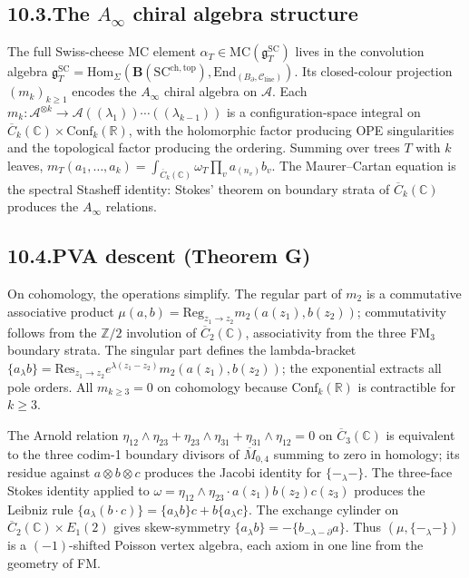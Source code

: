 \documentclass[11pt,reqno]{amsart}
\theoremstyle{definition}
\theoremstyle{remark}
\providecommand{\cA}{\mathcal{A}}
\providecommand{\cC}{\mathcal{C}}
\providecommand{\MC}{\mathrm{MC}}
\providecommand{\Hom}{\mathrm{Hom}}
\providecommand{\Res}{\mathrm{Res}}
\providecommand{\FM}{\overline{C}}
\providecommand{\fg}{\mathfrak{g}}
\providecommand{\bC}{\mathbb{C}}
\providecommand{\bZ}{\mathbb{Z}}
\providecommand{\bR}{\mathbb{R}}
\providecommand{\SCchtop}{\mathrm{SC}^{\mathrm{ch,top}}}
\providecommand{\End}{\mathrm{End}}
\providecommand{\Conf}{\mathrm{Conf}}
\providecommand{\SC}{\mathrm{SC}}
\providecommand{\Reg}{\mathrm{Reg}}
\numberwithin{equation}{section}
\begin{document}
\subsection*{10.3.\enspace The $A_\infty$ chiral algebra structure}

The full Swiss-cheese MC element $\alpha_T \in \MC(\fg^{\SC}_T)$
lives in the convolution algebra
$\fg^{\SC}_T = \Hom_\Sigma(\mathbf B(\SCchtop),
\End_{(B_\partial, \cC_{\mathrm{line}})})$. Its closed-colour
projection $(m_k)_{k \ge 1}$ encodes the $A_\infty$ chiral
algebra on $\cA$. Each $m_k\colon \cA^{\otimes k} \to
\cA(\!(\lambda_1)\!)\cdots(\!(\lambda_{k-1})\!)$ is a
configuration-space integral on
$\FM_k(\bC) \times \Conf_k(\bR)$, with the holomorphic factor
producing OPE singularities and the topological factor
producing the ordering. Summing over trees $T$ with $k$ leaves,
$m_T(a_1,\ldots,a_k) = \int_{\FM_k(\bC)}\omega_T \prod_{v}
a_{(n_v)} b_v$. The Maurer--Cartan equation is the spectral
Stasheff identity: Stokes' theorem on boundary strata of
$\FM_k(\bC)$ produces the $A_\infty$ relations.

\subsection*{10.4.\enspace PVA descent (Theorem G)}

On cohomology, the operations simplify. The regular part of
$m_2$ is a commutative associative product
$\mu(a,b) = \Reg_{z_1 \to z_2} m_2(a(z_1), b(z_2))$;
commutativity follows from the $\bZ/2$ involution of
$\FM_2(\bC)$, associativity from the three FM$_3$ boundary
strata. The singular part defines the lambda-bracket
$\{a_\lambda b\} = \Res_{z_1 \to z_2} e^{\lambda(z_1 - z_2)}
m_2(a(z_1), b(z_2))$; the exponential extracts all pole orders.
All $m_{k \ge 3} = 0$ on cohomology because $\Conf_k(\bR)$ is
contractible for $k \ge 3$.

The Arnold relation
$\eta_{12}\wedge\eta_{23} + \eta_{23}\wedge\eta_{31}
+ \eta_{31}\wedge\eta_{12} = 0$ on $\FM_3(\bC)$ is equivalent
to the three codim-1 boundary divisors of $\overline M_{0,4}$
summing to zero in homology; its residue against
$a\otimes b\otimes c$ produces the Jacobi identity for
$\{-_\lambda -\}$. The three-face Stokes identity applied to
$\omega = \eta_{12}\wedge\eta_{23}\cdot a(z_1)b(z_2)c(z_3)$
produces the Leibniz rule $\{a_\lambda(b\cdot c)\} =
\{a_\lambda b\}c + b\{a_\lambda c\}$. The exchange cylinder
on $\FM_2(\bC)\times E_1(2)$ gives skew-symmetry
$\{a_\lambda b\} = -\{b_{-\lambda - \partial} a\}$. Thus
$(\mu, \{-_\lambda -\})$ is a $(-1)$-shifted Poisson vertex
algebra, each axiom in one line from the geometry of FM.
\end{document}
